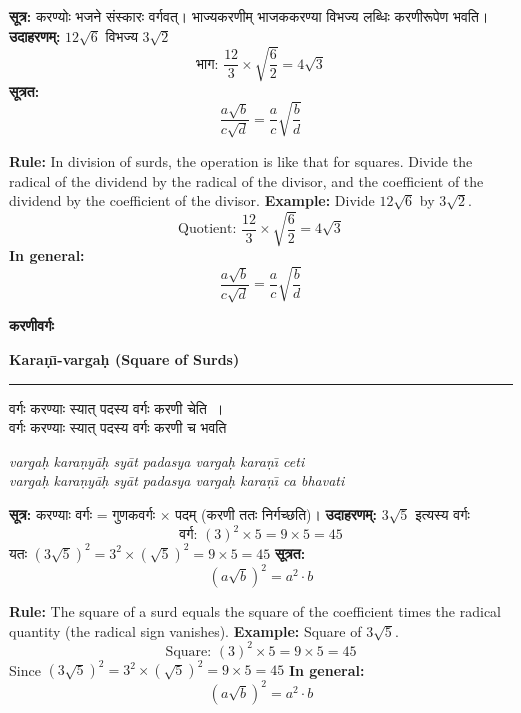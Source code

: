 \documentclass[11pt,a4paper]{article}
\newcommand{\dev}[1]{{\devanagarifont #1}}
\newcommand{\bicol}[2]{%
\noindent%
\begin{minipage}[t]{0.48\textwidth}
\begin{flushleft}
\small
#1
\end{flushleft}
\end{minipage}%
\hfill%
\begin{minipage}[t]{0.48\textwidth}
\begin{flushleft}
\small
#2
\end{flushleft}
\end{minipage}%
\vspace{0.4em}
}
\newcommand{\bicolverse}[2]{%
\par\noindent%
\begin{minipage}[t]{0.48\textwidth}
\centering
\color{versecolor}
\devanagarifont
\small
#1
\end{minipage}%
\hfill%
\begin{minipage}[t]{0.48\textwidth}
\centering
\color{versecolor}
\small
#2
\end{minipage}%
\par\vspace{0.4em}
}
\newcommand{\sectionbicol}[2]{%
\vspace{0.5em}
\noindent%
\begin{minipage}[t]{0.48\textwidth}
\begin{center}
\large\bfseries\color{sectioncolor}
\dev{#1}
\end{center}
\end{minipage}%
\hfill%
\begin{minipage}[t]{0.48\textwidth}
\begin{center}
\large\bfseries\color{sectioncolor}
#2
\end{center}
\end{minipage}%
\vspace{0.3em}
\noindent\rule{\textwidth}{0.4pt}
}
\begin{document}
\vspace{0.5cm}

\bicol{%
\textbf{सूत्र:} करण्योः भजने संस्कारः वर्गवत्। भाज्यकरणीम् भाजककरण्या विभज्य लब्धिः करणीरूपेण भवति।
\vspace{0.3cm}
\textbf{उदाहरणम्:} $12\sqrt{6}$ विभज्य $3\sqrt{2}$
\[\text{भाग: } \frac{12}{3} \times \sqrt{\frac{6}{2}} = 4\sqrt{3}\]
\textbf{सूत्रत:}
\[\frac{a\sqrt{b}}{c\sqrt{d}} = \frac{a}{c}\sqrt{\frac{b}{d}}\]
}{%
\textbf{Rule:} In division of surds, the operation is like that for squares. Divide the radical of the dividend by the radical of the divisor, and the coefficient of the dividend by the coefficient of the divisor.
\vspace{0.3cm}
\textbf{Example:} Divide $12\sqrt{6}$ by $3\sqrt{2}$.
\[\text{Quotient: } \frac{12}{3} \times \sqrt{\frac{6}{2}} = 4\sqrt{3}\]
\textbf{In general:}
\[\frac{a\sqrt{b}}{c\sqrt{d}} = \frac{a}{c}\sqrt{\frac{b}{d}}\]
}

\clearpage

\sectionbicol{करणीवर्गः}{Kara\d{n}\={\i}-varga\d{h} (Square of Surds)}

\vspace{0.3cm}

\bicolverse{%
वर्गः करण्याः स्यात् पदस्य वर्गः करणी चेति~।\\
वर्गः करण्याः स्यात् पदस्य वर्गः करणी च भवति~
}{%
\textit{varga\d{h} kara\d{n}y\={a}\d{h} sy\={a}t padasya varga\d{h} kara\d{n}\={\i} ceti}\\
\textit{varga\d{h} kara\d{n}y\={a}\d{h} sy\={a}t padasya varga\d{h} kara\d{n}\={\i} ca bhavati}
}

\vspace{0.5cm}

\bicol{%
\textbf{सूत्र:} करण्याः वर्गः = गुणकवर्गः $\times$ पदम् (करणी ततः निर्गच्छति)।
\vspace{0.3cm}
\textbf{उदाहरणम्:} $3\sqrt{5}$ इत्यस्य वर्गः
\[\text{वर्ग: } (3)^2 \times 5 = 9 \times 5 = 45\]
यतः $(3\sqrt{5})^2 = 3^2 \times (\sqrt{5})^2 = 9 \times 5 = 45$
\vspace{0.3cm}
\textbf{सूत्रत:}
\[(a\sqrt{b})^2 = a^2 \cdot b\]
}{%
\textbf{Rule:} The square of a surd equals the square of the coefficient times the radical quantity (the radical sign vanishes).
\vspace{0.3cm}
\textbf{Example:} Square of $3\sqrt{5}$.
\[\text{Square: } (3)^2 \times 5 = 9 \times 5 = 45\]
Since $(3\sqrt{5})^2 = 3^2 \times (\sqrt{5})^2 = 9 \times 5 = 45$
\vspace{0.3cm}
\textbf{In general:}
\[(a\sqrt{b})^2 = a^2 \cdot b\]
}
\end{document}
